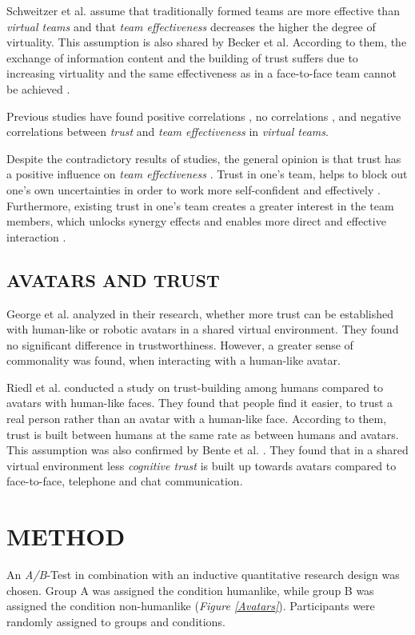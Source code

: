 \documentclass[sigchi]{acmart}
\begin{document}
Schweitzer et al. \citep{schweitzer2010conceptualizing} assume that traditionally formed teams are more effective than \textit{virtual teams} and that \textit{team effectiveness} decreases the higher the degree of virtuality.
This assumption is also shared by Becker et al. According to them, the exchange of information content and the building of trust suffers due to increasing virtuality and the same effectiveness as in a face-to-face team cannot be achieved \citep{handke2019alles}.

Previous studies have found positive correlations \citep{davis2000trusted}, no correlations \citep{hertel2004managing}, and negative correlations \citep{dirks1999effects} between \textit{trust} and \textit{team effectiveness} in \textit{virtual teams}.

Despite the contradictory results of studies, the general opinion is that trust has a positive influence on \textit{team effectiveness} \citep{de2016trust}. 
Trust in one's team, helps to block out one's own uncertainties in order to work more self-confident and effectively \citep{de2010does}. Furthermore, existing trust in one's team creates a greater interest in the team members, which unlocks synergy effects and enables more direct and effective interaction \citep{dirks1999effects}. 

\subsection{AVATARS AND TRUST}
George et al. \citep{george2018trusting} analyzed in their research, whether more trust can be established with human-like or robotic avatars in a shared virtual environment. They found no significant difference in trustworthiness. However, a greater sense of commonality was found, when interacting with a human-like avatar.

Riedl et al. \citep{riedl2014trusting} conducted a study on trust-building among humans compared to avatars with human-like faces. They found that people find it easier, to trust a real person rather than an avatar with a human-like face. According to them, trust is built between humans at the same rate as between humans and avatars.
This assumption was also confirmed by Bente et al. \citep[p. 54-59]{bente2004social}. They found that in a shared virtual environment less \textit{cognitive trust} is built up towards avatars compared to face-to-face, telephone and chat communication.

\section{METHOD}
An \textit{A/B}-Test in combination with an inductive quantitative research design was chosen.
Group A was assigned the condition humanlike, while group B was assigned the condition non-humanlike (\textit{Figure \ref{Avatars}}). Participants were randomly assigned to groups and conditions. 
\end{document}
